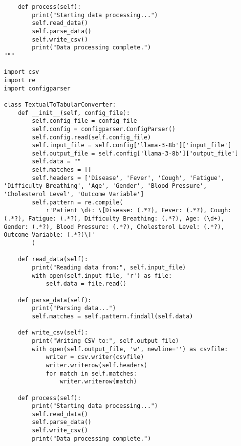 \begin{verbatim}
    def process(self):
        print("Starting data processing...")
        self.read_data()
        self.parse_data()
        self.write_csv()
        print("Data processing complete.")
"""

import csv
import re
import configparser

class TextualToTabularConverter:
    def __init__(self, config_file):
        self.config_file = config_file
        self.config = configparser.ConfigParser()
        self.config.read(self.config_file)
        self.input_file = self.config['llama-3-8b']['input_file']
        self.output_file = self.config['llama-3-8b']['output_file']
        self.data = ""
        self.matches = []
        self.headers = ['Disease', 'Fever', 'Cough', 'Fatigue', 'Difficulty Breathing', 'Age', 'Gender', 'Blood Pressure', 'Cholesterol Level', 'Outcome Variable']
        self.pattern = re.compile(
            r'Patient \d+: \[Disease: (.*?), Fever: (.*?), Cough: (.*?), Fatigue: (.*?), Difficulty Breathing: (.*?), Age: (\d+), Gender: (.*?), Blood Pressure: (.*?), Cholesterol Level: (.*?), Outcome Variable: (.*?)\]'
        )

    def read_data(self):
        print("Reading data from:", self.input_file)
        with open(self.input_file, 'r') as file:
            self.data = file.read()

    def parse_data(self):
        print("Parsing data...")
        self.matches = self.pattern.findall(self.data)

    def write_csv(self):
        print("Writing CSV to:", self.output_file)
        with open(self.output_file, 'w', newline='') as csvfile:
            writer = csv.writer(csvfile)
            writer.writerow(self.headers)
            for match in self.matches:
                writer.writerow(match)

    def process(self):
        print("Starting data processing...")
        self.read_data()
        self.parse_data()
        self.write_csv()
        print("Data processing complete.")

\end{verbatim}